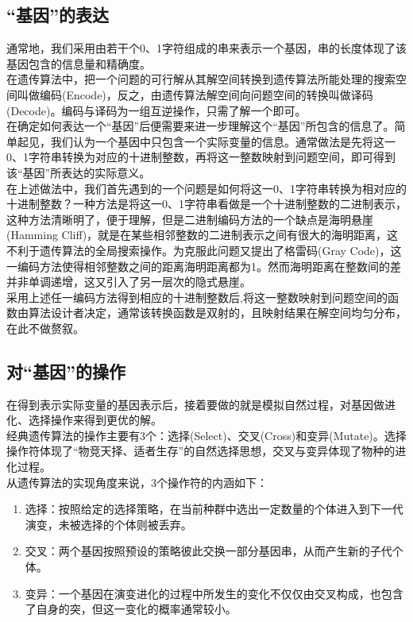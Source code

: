 \documentclass[UTF8]{ctexart}
\begin{document}
\subsection{“基因”的表达}
通常地，我们采用由若干个0、1字符组成的串来表示一个基因，串的长度体现了该基因包含的信息量和精确度。\\
\indent 在遗传算法中，把一个问题的可行解从其解空间转换到遗传算法所能处理的搜索空间叫做编码(Encode)，反之，由遗传算法解空间向问题空间的转换叫做译码(Decode)。编码与译码为一组互逆操作，只需了解一个即可。\\
\indent 在确定如何表达一个“基因”后便需要来进一步理解这个“基因”所包含的信息了。简单起见，我们认为一个基因中只包含一个实际变量的信息。通常做法是先将这一0、1字符串转换为对应的十进制整数，再将这一整数映射到问题空间，即可得到该“基因”所表达的实际意义。\\
\indent 在上述做法中，我们首先遇到的一个问题是如何将这一0、1字符串转换为相对应的十进制整数？一种方法是将这一0、1字符串看做是一个十进制整数的二进制表示，这种方法清晰明了，便于理解，但是二进制编码方法的一个缺点是海明悬崖(Hamming Cliff)，就是在某些相邻整数的二进制表示之间有很大的海明距离，这不利于遗传算法的全局搜索操作。为克服此问题又提出了格雷码(Gray Code)，这一编码方法使得相邻整数之间的距离海明距离都为1。然而海明距离在整数间的差并非单调递增，这又引入了另一层次的隐式悬崖。\\
\indent 采用上述任一编码方法得到相应的十进制整数后,将这一整数映射到问题空间的函数由算法设计者决定，通常该转换函数是双射的，且映射结果在解空间均匀分布，在此不做赘叙。

\subsection{对“基因”的操作}
在得到表示实际变量的基因表示后，接着要做的就是模拟自然过程，对基因做进化、选择操作来得到更优的解。\\
\indent 经典遗传算法的操作主要有3个：选择(Select)、交叉(Cross)和变异(Mutate)。选择操作符体现了“物竞天择、适者生存”的自然选择思想，交叉与变异体现了物种的进化过程。\\
\indent 从遗传算法的实现角度来说，3个操作符的内涵如下：
\begin{enumerate}[(1)]
\item 选择：按照给定的选择策略，在当前种群中选出一定数量的个体进入到下一代演变，未被选择的个体则被丢弃。
\item 交叉：两个基因按照预设的策略彼此交换一部分基因串，从而产生新的子代个体。
\item 变异：一个基因在演变进化的过程中所发生的变化不仅仅由交叉构成，也包含了自身的突，但这一变化的概率通常较小。
\end{enumerate}
\end{document}
